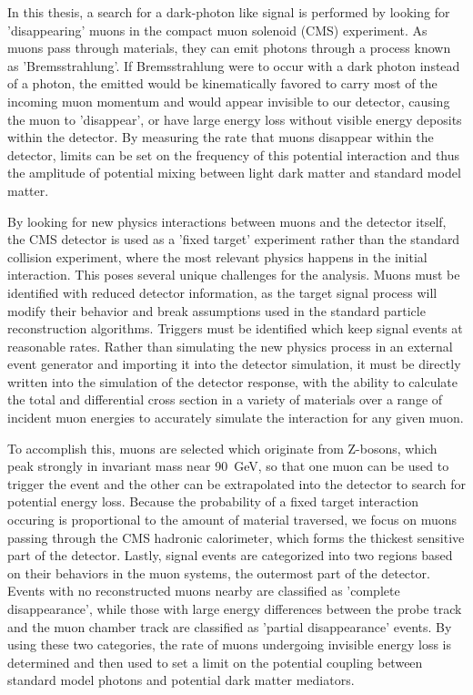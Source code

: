 In this thesis, a search for a dark-photon like signal is performed by looking for 'disappearing' muons in the compact muon solenoid (CMS) experiment. 
As muons pass through materials, they can emit photons through a process known as 'Bremsstrahlung'. 
If Bremsstrahlung were to occur with a dark photon instead of a photon, the emitted \aprime would be kinematically favored to carry most of the incoming muon momentum and would appear invisible to our detector, causing the muon to 'disappear', or have large energy loss without visible energy deposits within the detector.
By measuring the rate that muons disappear within the detector, limits can be set on the frequency of this potential interaction and thus the amplitude of potential mixing between light dark matter and standard model matter.

By looking for new physics interactions between muons and the detector itself, the CMS detector is used as a 'fixed target' experiment rather than the standard collision experiment, where the most relevant physics happens in the initial interaction.
This poses several unique challenges for the analysis.
Muons must be identified with reduced detector information, as the target signal process will modify their behavior and break assumptions used in the standard particle reconstruction algorithms.
Triggers must be identified which keep signal events at reasonable rates.
Rather than simulating the new physics process in an external event generator and importing it into the detector simulation, it must be directly written into the simulation of the detector response, with the ability to calculate the total and differential cross section in a variety of materials over a range of incident muon energies to accurately simulate the interaction for any given muon.

To accomplish this, muons are selected which originate from Z-bosons, which peak strongly in invariant mass near \SI{90}{\giga\eV}, so that one muon can be used to trigger the event and the other can be extrapolated into the detector to search for potential energy loss.
Because the probability of a fixed target interaction occuring is proportional to the amount of material traversed, we focus on muons passing through the CMS hadronic calorimeter, which forms the thickest sensitive part of the detector.
Lastly, signal events are categorized into two regions based on their behaviors in the muon systems, the outermost part of the detector. 
Events with no reconstructed muons nearby are classified as 'complete disappearance', while those with large energy differences between the probe track and the muon chamber track are classified as 'partial disappearance' events.
By using these two categories, the rate of muons undergoing invisible energy loss is determined and then used to set a limit on the potential coupling between standard model photons and potential dark matter mediators.

